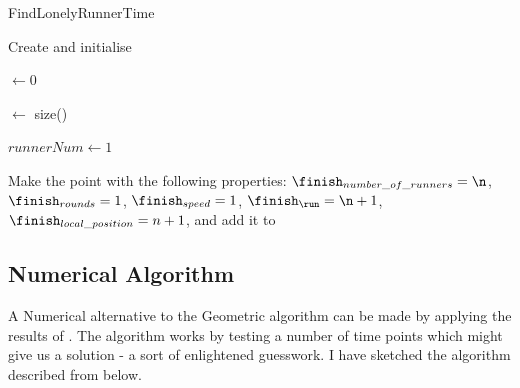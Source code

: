 \begin{algorithm}[H]
  \caption{FindLonelyRunnerTime}
  \highlights

  Create and initialise \li
  
  \inter $\gets 0$
  
  \n $\gets$ size(\s)
  
  $runnerNum \gets 1$
  
  Make the point \finish with the following properties: $\finish_{number\_of\_runners} = \n$, $\finish_{rounds} = 1$, $\finish_{speed} = 1$, $\finish_{\run} = \n + 1$, $\finish_{local\_position} = n + 1$, and add it to \li

  
\end{algorithm}

\subsection{Numerical Algorithm}
\label{numtheory:algo}
A Numerical alternative to the Geometric algorithm can be made by applying the results of \cite{invis}. The algorithm works by testing a number of time points which might give us a solution - a sort of enlightened guesswork. I have sketched the algorithm described from \cite{invis} below. 

